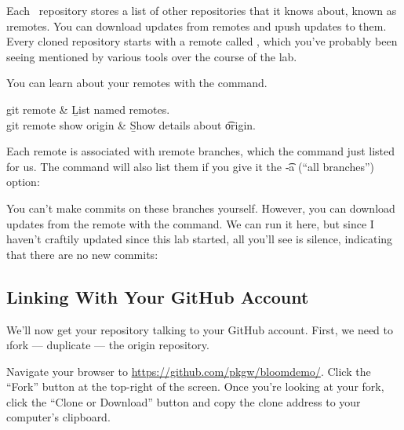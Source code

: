 \documentclass[letterpaper, 12pt, titlepage, twoside]{article}
\begin{document}
Each \git\ repository stores a list of other repositories that it knows about,
known as \i{remotes}. You can download updates from remotes and \i{push}
updates to them. Every cloned repository starts with a remote called
, which you've probably been seeing mentioned by various tools over
the course of the lab.

You can learn about your remotes with the  command.

\begin{typeme}
git remote & \b{List named remotes.} \\
git remote show origin & \b{Show details about \t{origin}.}
\end{typeme}

Each remote is associated with \i{remote branches}, which the  command just listed for us. The  command will also list
them if you give it the \t{-a} (``all branches'') option:


You can't make commits on these branches yourself. However, you can download
updates from the remote with the  command. We can run it here, but
since I haven't craftily updated  since this lab started, all you'll
see is silence, indicating that there are no new commits:


\subsection*{Linking With Your GitHub Account}


We'll \x now get your repository talking to your GitHub account. First, we need
to \i{fork} --- duplicate --- the origin repository.

\begin{noncli}
  Navigate your browser to \url{https://github.com/pkgw/bloomdemo/}. Click the
  ``Fork'' button at the top-right of the screen. Once you’re looking at your
  fork, click the “Clone or Download” button and copy the clone address to
  your computer’s clipboard.
\end{noncli}
\end{document}
